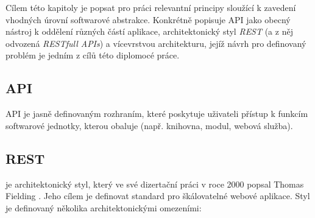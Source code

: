 Cílem této kapitoly je popsat pro práci relevantní principy sloužící k zavedení vhodných úrovní softwarové abstrakce. Konkrétně popisuje API jako obecný nástroj k oddělení různých částí aplikace, architektonický styl \textit{REST} (a z něj odvozená \textit{RESTfull APIs}) a vícevrstvou architekturu, jejíž návrh pro definovaný problém je jedním z cílů této diplomocé práce.     

\subsection{API}
API je jasně definovaným rozhraním, které poskytuje uživateli přístup k funkcím softwarové jednotky, kterou obaluje (např. knihovna, modul, webová služba). 









\subsection{REST}
\label{sec:rest}
\textit{} je architektonický styl, který ve své dizertační práci v roce 2000 popsal Thomas Fielding \cite{Fielding00}. Jeho cílem je definovat standard pro škálovatelné webové aplikace. Styl je definovaný několika architektonickými omezeními: 


